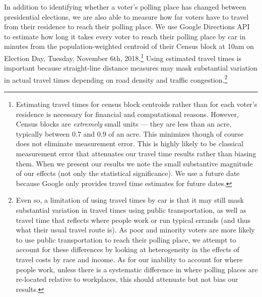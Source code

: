 \documentclass{cup_PSRM}
\begin{document}
In addition to identifying whether a voter's polling place has changed between presidential elections, we are also able to measure how far voters have to travel from their residence to reach their polling place.  We use Google Directions API to estimate how long it takes every voter to reach their polling place by car in minutes from the population-weighted centroid of their Census block at 10am on Election Day, Tuesday, November 6th, 2018.\footnote{Estimating travel times for census block centroids rather than for each voter's residence is necessary for financial and computational reasons.  However, Census blocks are \emph{extremely} small units --- they are less than an acre, typically between 0.7 and 0.9 of an acre.  This minimizes though of course does not eliminate measurement error.  This is highly likely to be classical measurement error that attenuates our travel time results rather than biasing them.  When we present our results we note the small substantive magnitude of our effects (not only the statistical significance).   We use a future date because Google only provides travel time estimates for future dates.}  Using estimated travel times is important because straight-line distance measures may mask substantial variation in actual travel times depending on road density and traffic congestion.\footnote{Even so, a limitation of using travel times by car is that it may still mask substantial variation in travel times using public transportation, as well as travel time that reflects where people work or run typical errands (and thus what their usual travel route is).  As poor and minority voters are more likely to use public transportation to reach their polling place, we attempt to account for these differences by looking at heterogeneity in the effects of travel costs by race and income. As for our inability to account for where people work, unless there is a systematic difference in where polling places are re-located relative to workplaces, this should attenuate but not bias our results.}
\end{document}
